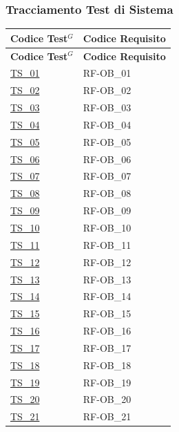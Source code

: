 \subsubsection{Tracciamento Test di Sistema}
\begin{longtable}{|
		>{\raggedright\arraybackslash}p{} |
		>{\centering\arraybackslash}p{} |
	}
	\hline
	\rowcolor[gray]{0.9}
	\textbf{Codice Test$^G$} & \textbf{Codice Requisito}\\
	\hline
	\endfirsthead
	
	\hline
	\rowcolor[gray]{0.9}
	\textbf{Codice Test$^G$} & \textbf{Codice Requisito}\\
	\hline
	\endhead
	
	\hline
	
	\hyperlink{ts-01}{TS\_01} & RF-OB\_01 \\ \hline
	\hyperlink{ts-02}{TS\_02} & RF-OB\_02 \\ \hline
	\hyperlink{ts-03}{TS\_03} & RF-OB\_03 \\ \hline
	\hyperlink{ts-04}{TS\_04} & RF-OB\_04 \\ \hline
	\hyperlink{ts-05}{TS\_05} & RF-OB\_05 \\ \hline
	\hyperlink{ts-06}{TS\_06} & RF-OB\_06 \\ \hline
	\hyperlink{ts-07}{TS\_07} & RF-OB\_07 \\ \hline
	\hyperlink{ts-08}{TS\_08} & RF-OB\_08 \\ \hline
	\hyperlink{ts-09}{TS\_09} & RF-OB\_09 \\ \hline
	\hyperlink{ts-10}{TS\_10} & RF-OB\_10 \\ \hline
	\hyperlink{ts-11}{TS\_11} & RF-OB\_11 \\ \hline
	\hyperlink{ts-12}{TS\_12} & RF-OB\_12 \\ \hline
	\hyperlink{ts-13}{TS\_13} & RF-OB\_13 \\ \hline
	\hyperlink{ts-14}{TS\_14} & RF-OB\_14 \\ \hline
	\hyperlink{ts-15}{TS\_15} & RF-OB\_15 \\ \hline
	\hyperlink{ts-16}{TS\_16} & RF-OB\_16 \\ \hline
	\hyperlink{ts-17}{TS\_17} & RF-OB\_17 \\ \hline
	\hyperlink{ts-18}{TS\_18} & RF-OB\_18 \\ \hline
	\hyperlink{ts-19}{TS\_19} & RF-OB\_19 \\ \hline
	\hyperlink{ts-20}{TS\_20} & RF-OB\_20 \\ \hline
	\hyperlink{ts-21}{TS\_21} & RF-OB\_21 \\ \hline

\end{longtable}
